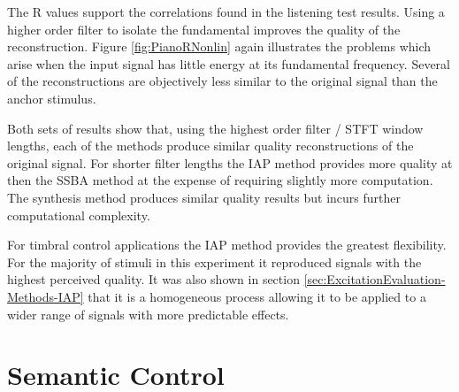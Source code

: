 	The R values support the correlations found in the listening test results. Using a higher order filter
	to isolate the fundamental improves the quality of the reconstruction. Figure \ref{fig:PianoRNonlin} again
	illustrates the problems which arise when the input signal has little energy at its fundamental frequency. Several
	of the reconstructions are objectively less similar to the original signal than the anchor stimulus.

	Both sets of results show that, using the highest order filter / STFT window lengths, each of the methods produce
	similar quality reconstructions of the original signal. For shorter filter lengths the IAP method provides more
	quality at then the SSBA method at the expense of requiring slightly more computation. The synthesis method produces
	similar quality results but incurs further computational complexity. 

	For timbral control applications the IAP method provides the greatest flexibility. For the majority of stimuli in
	this experiment it reproduced signals with the highest perceived quality. It was also shown in section
	\ref{sec:ExcitationEvaluation-Methods-IAP} that it is a homogeneous process allowing it to be applied to a wider
	range of signals with more predictable effects.

\section{Semantic Control}
\label{sec:PerceptualExperiments-SemanticControl}
